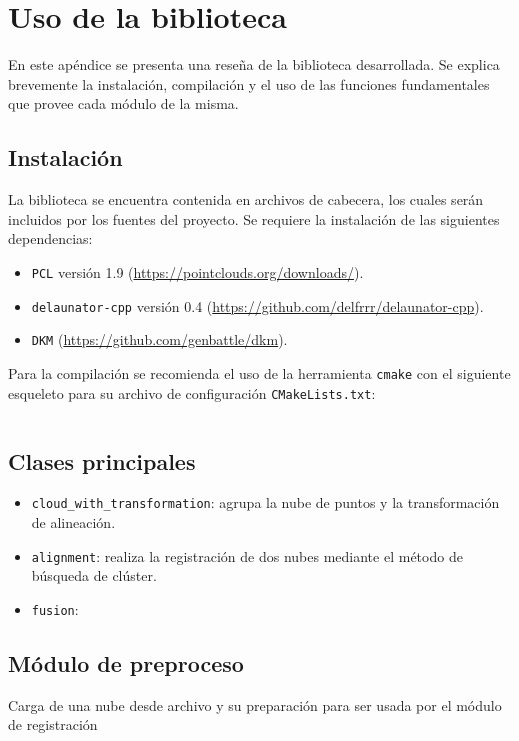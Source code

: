 \chapter{Uso de la biblioteca}
En este apéndice se presenta una reseña de la biblioteca desarrollada.
Se explica brevemente la instalación, compilación y el uso de las funciones fundamentales
que provee cada módulo de la misma.

	\section{Instalación}
	La biblioteca se encuentra contenida en archivos de cabecera, los cuales serán incluidos por los fuentes del proyecto.
	Se requiere la instalación de las siguientes dependencias:
	\begin{itemize}
		\item \texttt{PCL} versión 1.9 (\url{https://pointclouds.org/downloads/}).
		\item \texttt{delaunator-cpp} versión 0.4 (\url{https://github.com/delfrrr/delaunator-cpp}).
		\item \texttt{DKM} (\url{https://github.com/genbattle/dkm}).
	\end{itemize}

	Para la compilación se recomienda el uso de la herramienta \texttt{cmake} con el siguiente esqueleto para su archivo de configuración \texttt{CMakeLists.txt}:
	\inputminted{cmake}{code/CMakeLists.txt}

	\section{Clases principales}
	\begin{itemize}
		\item \verb|cloud_with_transformation|: agrupa la nube de puntos y la transformación de alineación.
		\item \verb|alignment|: realiza la registración de dos nubes mediante el método de búsqueda de clúster.
		\item \verb|fusion|: 
	\end{itemize}

	\section{Módulo de preproceso}
	Carga de una nube desde archivo y su preparación para ser usada por el módulo de registración
	\inputminted{cpp}{code/preproceso.cpp}

